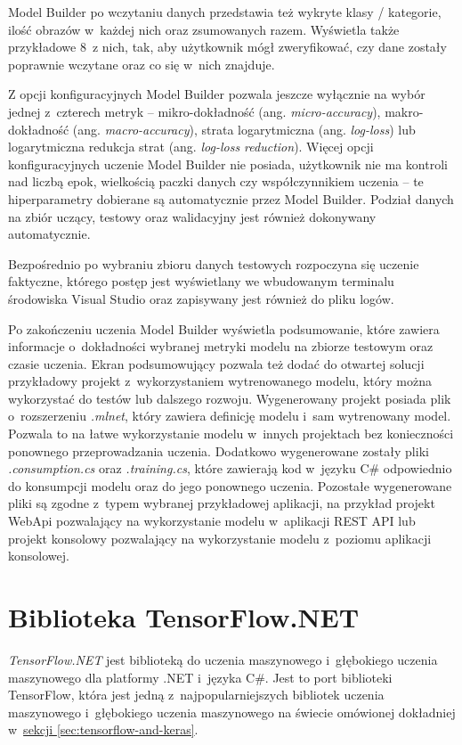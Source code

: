 Model Builder po wczytaniu danych przedstawia też wykryte klasy / kategorie, ilość obrazów w~każdej nich oraz zsumowanych razem.
Wyświetla także przykładowe 8~z nich, tak, aby użytkownik mógł zweryfikować, czy dane zostały poprawnie wczytane oraz co się w~nich znajduje.

Z opcji konfiguracyjnych Model Builder pozwala jeszcze wyłącznie na wybór jednej z~czterech metryk -- mikro-dokładność (ang. \emph{micro-accuracy}), makro-dokładność (ang. \emph{macro-accuracy}), strata logarytmiczna (ang. \emph{log-loss}) lub logarytmiczna redukcja strat (ang. \emph{log-loss reduction}).
Więcej opcji konfiguracyjnych uczenie Model Builder nie posiada, użytkownik nie ma kontroli nad liczbą epok, wielkością paczki danych czy współczynnikiem uczenia -- te hiperparametry dobierane są automatycznie przez Model Builder.
Podział danych na zbiór uczący, testowy oraz walidacyjny jest również dokonywany automatycznie.

Bezpośrednio po wybraniu zbioru danych testowych rozpoczyna się uczenie faktyczne, którego postęp jest wyświetlany we wbudowanym terminalu środowiska Visual Studio oraz zapisywany jest również do pliku logów.

Po zakończeniu uczenia Model Builder wyświetla podsumowanie, które zawiera informacje o~dokładności wybranej metryki modelu na zbiorze testowym oraz czasie uczenia.
Ekran podsumowujący pozwala też dodać do otwartej solucji przykładowy projekt z~wykorzystaniem wytrenowanego modelu, który można wykorzystać do testów lub dalszego rozwoju.
Wygenerowany projekt posiada plik o~rozszerzeniu \emph{.mlnet}, który zawiera definicję modelu i~sam wytrenowany model.
Pozwala to na łatwe wykorzystanie modelu w~innych projektach bez konieczności ponownego przeprowadzania uczenia.
Dodatkowo wygenerowane zostały pliki \emph{.consumption.cs} oraz \emph{.training.cs}, które zawierają kod w~języku C\# odpowiednio do konsumpcji modelu oraz do jego ponownego uczenia.
Pozostałe wygenerowane pliki są zgodne z~typem wybranej przykładowej aplikacji, na przykład projekt WebApi pozwalający na wykorzystanie modelu w~aplikacji REST API lub projekt konsolowy pozwalający na wykorzystanie modelu z~poziomu aplikacji konsolowej.

\section{Biblioteka TensorFlow.NET}
\label{sec:tensorflownet}

\emph{TensorFlow.NET} jest biblioteką do uczenia maszynowego i~głębokiego uczenia maszynowego dla platformy .NET i~języka C\#.
Jest to port biblioteki TensorFlow, która jest jedną z~najpopularniejszych bibliotek uczenia maszynowego i~głębokiego uczenia maszynowego na świecie omówionej dokładniej w~\hyperref[sec:tensorflow-and-keras]{sekcji \ref*{sec:tensorflow-and-keras}}.

